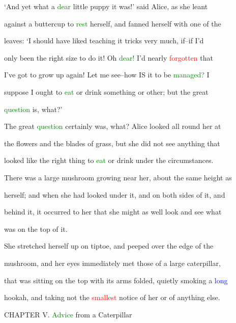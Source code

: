  ‘And yet what a \textcolor{green}{dear} little \textcolor{BurntOrange}{puppy} it was!’ said Alice, as she leant

 against a buttercup to \textcolor{green}{rest} herself, and fanned herself with one of the

 leaves: ‘I should have liked \textcolor{BurntOrange}{teaching} it \textcolor{BurntOrange}{tricks} very much, if--if I’d

 only been the right size to do it! Oh \textcolor{green}{dear!} I’d nearly \textcolor{red}{forgotten} that

 I’ve got to \textcolor{BurntOrange}{grow} up again! Let me see--how IS it to be \textcolor{green}{managed?} I

 suppose I ought to \textcolor{green}{eat} or drink something or other; but the great

 \textcolor{green}{question} is, what?’



 The great \textcolor{green}{question} certainly was, what? Alice looked all round her at

 the flowers and the blades of grass, but she did not see anything that

 looked like the right thing to \textcolor{green}{eat} or drink under the circumstances.

 There was a large mushroom \textcolor{BurntOrange}{growing} near her, about the same height as

 herself; and when she had looked under it, and on both sides of it, and

 behind it, it occurred to her that she might as well look and see what

 was on the \textcolor{BurntOrange}{top} of it.



 She stretched herself up on tiptoe, and peeped over the edge of the

 mushroom, and her eyes \textcolor{BurntOrange}{immediately} met those of a large caterpillar,

 that was sitting on the \textcolor{BurntOrange}{top} with its arms folded, quietly smoking a \textcolor{blue}{long}

 hookah, and taking not the \textcolor{red}{smallest} notice of her or of anything else.









 CHAPTER V. \textcolor{green}{Advice} from a Caterpillar



